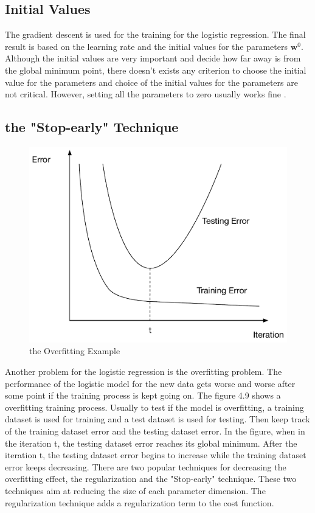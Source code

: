 \subsection{Initial Values}
The gradient descent is used for the training for the logistic regression. The final result is based on the learning rate and the initial values for the parameters $\textbf{w}^0$. Although the initial values are very important and decide how far away is from the global minimum point, there doesn't exists any criterion to choose the initial value for the parameters and choice of the initial values for the parameters are not critical. However, setting all the parameters to zero usually works fine \cite{allison2008convergence}. 

\subsection{the "Stop-early" Technique}
\begin{figure}
\centering
\includegraphics[scale=0.6]{overfittingExample.pdf}
\caption{the Overfitting Example}
\end{figure} 
Another problem for the logistic regression is the overfitting problem. The performance of the logistic model for the new data gets worse and worse after some point if the training process is kept going on. The figure 4.9 shows a overfitting training process. Usually to test if the model is overfitting, a training dataset is used for training and a test dataset is used for testing. Then keep track of the training dataset error and the testing dataset error. In the figure, when in the iteration t, the testing dataset error reaches its global minimum. After the iteration t, the testing dataset error begins to increase while the training dataset error keeps decreasing. There are two popular techniques for decreasing the overfitting effect, the regularization and the "Stop-early" technique. These two techniques aim at reducing the size of each parameter dimension. The regularization technique adds a regularization term to the cost function.
